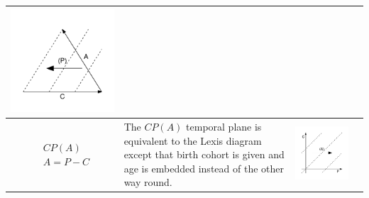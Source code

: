 \documentclass[11pt,oneside,a4paper]{article} %
\begin{document}
\begin{center}
\begin{longtable}{m{}m{}m{}m{}}
  \includegraphics[width = \linewidth]{Figures/JonasTable/ACp_iso.pdf}  \\
  \midrule
  $$\begin{aligned}
    &CP(A) \\
    &A = P - C
  \end{aligned}$$ &
  The $CP(A)$ temporal plane is equivalent to the Lexis diagram except that birth cohort is given and age is embedded instead of the other way round. &
  \includegraphics[width = \linewidth]{Figures/JonasTable/CPa.pdf} &

\end{longtable}
\end{center}
\end{document}
